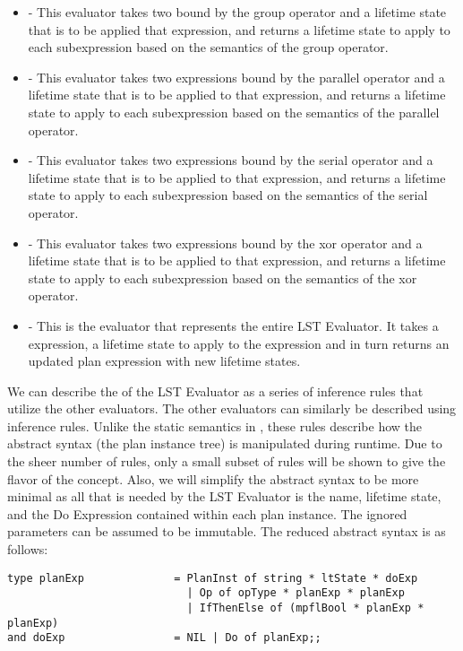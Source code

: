 \begin{itemize}
\item \textbf{} - This evaluator takes two  bound by the group operator and a lifetime state that is to be applied that expression, and returns a lifetime state to apply to each subexpression based on the semantics of the group operator.
\item \textbf{} - This evaluator takes two  expressions bound by the parallel operator and a lifetime state that is to be applied to that expression, and returns a lifetime state to apply to each subexpression based on the semantics of the parallel operator.
\item \textbf{} - This evaluator takes two  expressions bound by the serial operator and a lifetime state that is to be applied to that expression, and returns a lifetime state to apply to each subexpression based on the semantics of the serial operator.
\item \textbf{} - This evaluator takes two  expressions bound by the xor operator and a lifetime state that is to be applied to that expression, and returns a lifetime state to apply to each subexpression based on the semantics of the xor operator.
\item \textbf{} - This is the evaluator that represents the entire LST Evaluator. It takes a  expression, a lifetime state to apply to the expression and in turn returns an updated plan expression with new lifetime states.
\end{itemize}

We can describe the  of the LST Evaluator as a series of inference rules that utilize the other evaluators. The other evaluators can similarly be described using inference rules. Unlike the static semantics in , these rules describe how the abstract syntax (the plan instance tree) is manipulated during runtime. Due to the sheer number of rules, only a small subset of rules will be shown to give the flavor of the concept. Also, we will simplify the abstract syntax to be more minimal as all that is needed by the LST Evaluator is the name, lifetime state, and the Do Expression contained within each plan instance. The ignored parameters can be assumed to be immutable. The reduced abstract syntax is as follows:
\begin{verbatim}
type planExp              = PlanInst of string * ltState * doExp
                            | Op of opType * planExp * planExp 
                            | IfThenElse of (mpflBool * planExp * planExp)
and doExp                 = NIL | Do of planExp;;
\end{verbatim}

